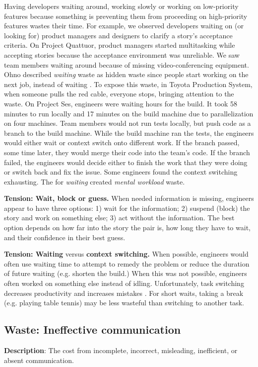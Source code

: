 Having developers waiting around, working slowly or working on low-priority features because something is preventing them from proceeding on high-priority features wastes their time. For example, we observed developers waiting on (or looking for) product managers and designers to clarify a story's acceptance criteria. On Project Quattuor, product managers started multitasking while accepting stories because the acceptance environment was unreliable. We saw team members waiting around because of missing video-conferencing equipment. 
Ohno described \textit{waiting} waste as hidden waste since people start working on the next job, instead of waiting \cite{OhnoToyotaProductionSystem}. To expose this waste, in Toyota Production System, when someone pulls the red cable, everyone stops, bringing attention to the waste. On Project Ses, engineers were waiting hours for the build. It took 58 minutes to run locally and 17 minutes on the build machine due to parallelization on four machines. Team members would not run tests locally, but push code as a branch to the build machine. While the build machine ran the tests, the engineers would either wait or context switch onto different work. If the branch passed, some time later, they would merge their code into the team's code. If the branch failed, the engineers would decide either to finish the work that they were doing or switch back and fix the issue. Some engineers found the context switching exhausting. The  for \textit{waiting} created \textit{mental workload} waste.

\textbf{Tension: Wait, block or guess.}
When needed information is missing, engineers appear to have three options: 1) wait for the information; 2) suspend (block) the story and work on something else; 3) act without the information. The best option depends on how far into the story the pair is, how long they have to wait, and their confidence in their best guess.

\textbf{Tension: Waiting} versus \textbf{context switching.}
When possible, engineers would often use waiting time to attempt to remedy the problem or reduce the duration of future waiting (e.g. shorten the build.) When this was not possible, engineers often worked on something else instead of idling. Unfortunately, task switching decreases productivity and increases mistakes \cite{MonsellTaskSwitching}. For short waits, taking a break (e.g. playing table tennis) may be less wasteful than switching to another task. 

\subsection{Waste: Ineffective communication}
\textbf{Description}: The cost from incomplete, incorrect, misleading, inefficient, or absent communication.

